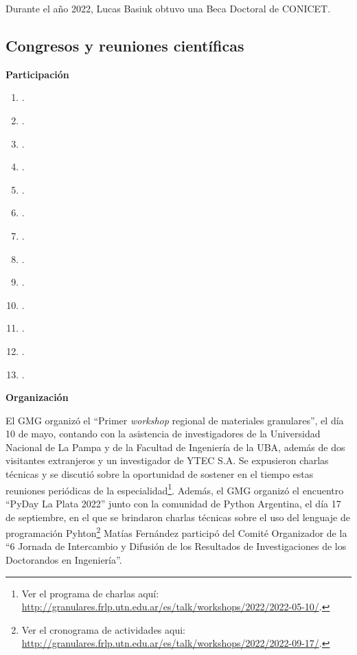 \documentclass[a4paper,11pt,twoside,final,titlepage,onecolumn,openright]{report}
\begin{document}
Durante el año 2022, Lucas Basiuk obtuvo una Beca Doctoral de CONICET.

\subsection{Congresos y reuniones científicas}

{\bf Participación}

\begin{enumerate}
\item {}.
\item {}.
\item {}.
\item {}.
\item {}.
\item {}.
\item {}.
\item {}.
\item {}.
\item {}.
\item {}.
\item {}.
\item {}.
\end{enumerate}

\vspace{0.25cm}
{\bf Organización}
\vspace{0.5cm}

El GMG organizó el ``Primer \textit{workshop} regional de materiales granulares'', el día 10 de mayo, contando con la asistencia de investigadores de la Universidad Nacional de La Pampa y de la Facultad de Ingeniería de la UBA, además de dos visitantes extranjeros y un investigador de YTEC S.A. Se expusieron charlas técnicas y se discutió sobre la oportunidad de sostener en el tiempo estas reuniones periódicas de la especialidad\footnote{Ver el programa de charlas aquí: \url{http://granulares.frlp.utn.edu.ar/es/talk/workshops/2022/2022-05-10/}.}. Además, el GMG organizó el encuentro ``PyDay La Plata 2022'' junto con la comunidad de Python Argentina, el día 17 de septiembre, en el que se brindaron charlas técnicas sobre el uso del lenguaje de programación Pyhton\footnote{Ver el cronograma de actividades aqui: \url{http://granulares.frlp.utn.edu.ar/es/talk/workshops/2022/2022-09-17/}.} Matías Fernández participó del Comité Organizador de la ``6 Jornada de Intercambio y Difusión de los Resultados de Investigaciones de los Doctorandos en Ingeniería''.
\end{document}

